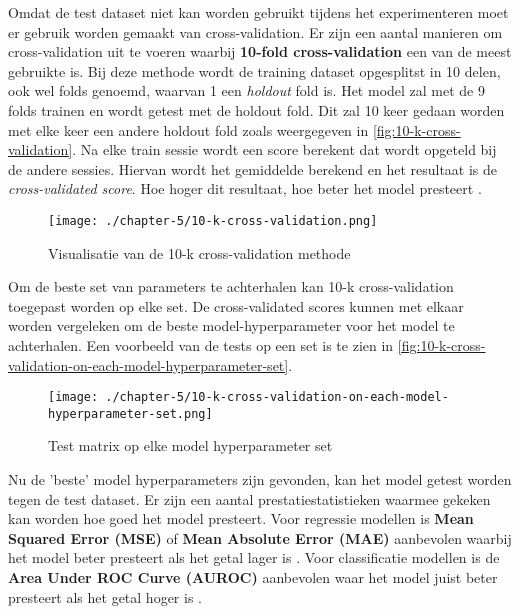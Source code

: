 Omdat de test dataset niet kan worden gebruikt tijdens het experimenteren moet er gebruik worden gemaakt van \gls{cross-validation}. Er zijn een aantal manieren om \gls{cross-validation} uit te voeren waarbij \textbf{10-fold cross-validation} een van de meest gebruikte is. Bij deze methode wordt de training dataset opgesplitst in 10 delen, ook wel \glspl{fold} genoemd, waarvan 1 een \textit{holdout} \gls{fold} is. Het model zal met de 9 \glspl{fold} trainen en wordt getest met de holdout \gls{fold}. Dit zal 10 keer gedaan worden met elke keer een andere holdout fold zoals weergegeven in \autoref{fig:10-k-cross-validation}. Na elke train sessie wordt een score berekent dat wordt opgeteld bij de andere sessies. Hiervan wordt het gemiddelde berekend en het resultaat is de \textit{cross-validated score}. Hoe hoger dit resultaat, hoe beter het model presteert \cite{data-science-primer}.

\begin{figure}[hbt!]
  \centering
  \texttt{[image: ./chapter-5/10-k-cross-validation.png]}
  \caption{Visualisatie van de 10-k cross-validation methode}
  \label{fig:10-k-cross-validation}
\end{figure}

Om de beste set van parameters te achterhalen kan 10-k cross-validation  toegepast worden op elke set. De cross-validated scores kunnen met elkaar worden vergeleken om de beste \gls{model-hyperparameter} voor het model te achterhalen. Een voorbeeld van de tests op een set is te zien in \autoref{fig:10-k-cross-validation-on-each-model-hyperparameter-set}.

\begin{figure}[hbt!]
  \centering
  \texttt{[image: ./chapter-5/10-k-cross-validation-on-each-model-hyperparameter-set.png]}
  \caption{Test matrix op elke model hyperparameter set}
  \label{fig:10-k-cross-validation-on-each-model-hyperparameter-set}
\end{figure}

\bigskip\bigskip\bigskip\bigskip\bigskip\bigskip\bigskip\bigskip
Nu de 'beste' model hyperparameters zijn gevonden, kan het model getest worden tegen de test dataset. Er zijn een aantal prestatiestatistieken waarmee gekeken kan worden hoe goed het model presteert. Voor regressie modellen is \textbf{Mean Squared Error (MSE)} of \textbf{Mean Absolute Error (MAE)} aanbevolen waarbij het model beter presteert als het getal lager is \cite{data-science-primer}. Voor classificatie modellen is de \textbf{Area Under ROC Curve (AUROC)} aanbevolen waar het model juist beter presteert als het getal hoger is \cite{data-science-primer}.

